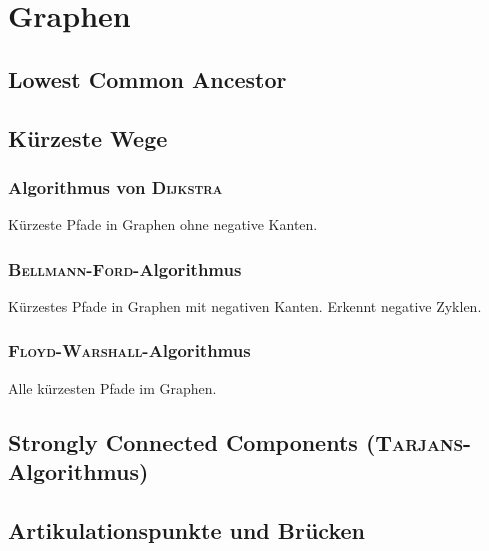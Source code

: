\section{Graphen}

\subsection{Lowest Common Ancestor}


\subsection{Kürzeste Wege}

\subsubsection{Algorithmus von \textsc{Dijkstra}}
Kürzeste Pfade in Graphen ohne negative Kanten.


\subsubsection{\textsc{Bellmann-Ford}-Algorithmus}
Kürzestes Pfade in Graphen mit negativen Kanten. Erkennt negative Zyklen.


\subsubsection{\textsc{Floyd-Warshall}-Algorithmus}
Alle kürzesten Pfade im Graphen.


\subsection{Strongly Connected Components (\textsc{Tarjans}-Algorithmus)}


\subsection{Artikulationspunkte und Brücken}


